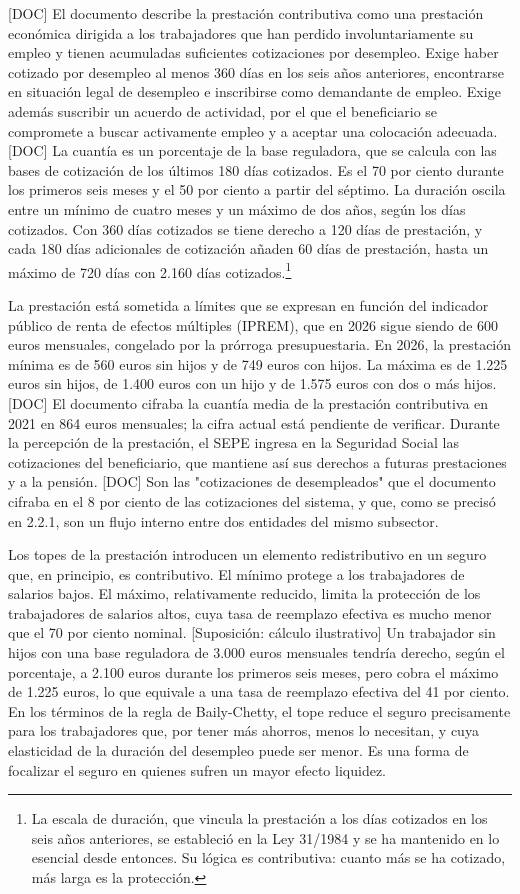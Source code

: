 \documentclass[10pt,a4paper]{article}
\begin{document}
[DOC] El documento describe la prestación contributiva como una prestación económica dirigida a los trabajadores que han perdido involuntariamente su empleo y tienen acumuladas suficientes cotizaciones por desempleo. Exige haber cotizado por desempleo al menos 360 días en los seis años anteriores, encontrarse en situación legal de desempleo e inscribirse como demandante de empleo. Exige además suscribir un acuerdo de actividad, por el que el beneficiario se compromete a buscar activamente empleo y a aceptar una colocación adecuada. [DOC] La cuantía es un porcentaje de la base reguladora, que se calcula con las bases de cotización de los últimos 180 días cotizados. Es el 70 por ciento durante los primeros seis meses y el 50 por ciento a partir del séptimo. La duración oscila entre un mínimo de cuatro meses y un máximo de dos años, según los días cotizados. Con 360 días cotizados se tiene derecho a 120 días de prestación, y cada 180 días adicionales de cotización añaden 60 días de prestación, hasta un máximo de 720 días con 2.160 días cotizados.\footnote{La escala de duración, que vincula la prestación a los días cotizados en los seis años anteriores, se estableció en la Ley 31/1984 y se ha mantenido en lo esencial desde entonces. Su lógica es contributiva: cuanto más se ha cotizado, más larga es la protección.
}


La prestación está sometida a límites que se expresan en función del indicador público de renta de efectos múltiples (IPREM), que en 2026 sigue siendo de 600 euros mensuales, congelado por la prórroga presupuestaria. En 2026, la prestación mínima es de 560 euros sin hijos y de 749 euros con hijos. La máxima es de 1.225 euros sin hijos, de 1.400 euros con un hijo y de 1.575 euros con dos o más hijos. [DOC] El documento cifraba la cuantía media de la prestación contributiva en 2021 en 864 euros mensuales; la cifra actual está pendiente de verificar. Durante la percepción de la prestación, el SEPE ingresa en la Seguridad Social las cotizaciones del beneficiario, que mantiene así sus derechos a futuras prestaciones y a la pensión. [DOC] Son las "cotizaciones de desempleados" que el documento cifraba en el 8 por ciento de las cotizaciones del sistema, y que, como se precisó en 2.2.1, son un flujo interno entre dos entidades del mismo subsector.

Los topes de la prestación introducen un elemento redistributivo en un seguro que, en principio, es contributivo. El mínimo protege a los trabajadores de salarios bajos. El máximo, relativamente reducido, limita la protección de los trabajadores de salarios altos, cuya tasa de reemplazo efectiva es mucho menor que el 70 por ciento nominal. [Suposición: cálculo ilustrativo] Un trabajador sin hijos con una base reguladora de 3.000 euros mensuales tendría derecho, según el porcentaje, a 2.100 euros durante los primeros seis meses, pero cobra el máximo de 1.225 euros, lo que equivale a una tasa de reemplazo efectiva del 41 por ciento. En los términos de la regla de Baily-Chetty, el tope reduce el seguro precisamente para los trabajadores que, por tener más ahorros, menos lo necesitan, y cuya elasticidad de la duración del desempleo puede ser menor. Es una forma de focalizar el seguro en quienes sufren un mayor efecto liquidez.
\end{document}
